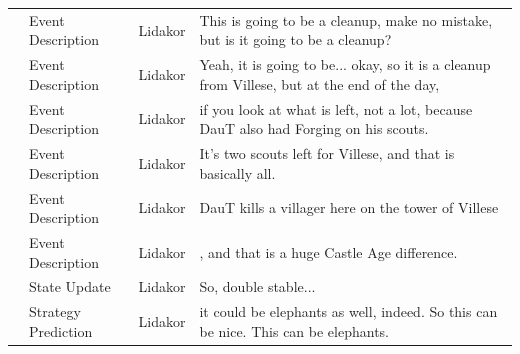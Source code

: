 {\begin{longtable}{@{}>{\theAppRow}r|L{2.3cm}L{1.0cm}U{11.55cm}@{}}
    & Event Description     & Lidakor & This is going to be a cleanup, make no mistake, but is it going to be a cleanup?                                                                                                                                                                                                                \\
    & Event Description     & Lidakor & Yeah, it is going to be... okay, so it is a cleanup from Villese, but at the end of the day,                                                                                                                                                                                                    \\
    & Event Description     & Lidakor & if you look at what is left, not a lot, because DauT also had Forging on his scouts.                                                                                                                                                                                                            \\
    & Event Description     & Lidakor & It's two scouts left for Villese, and that is basically all.                                                                                                                                                                                                                                    \\
    & Event Description     & Lidakor & DauT kills a villager here on the tower of Villese                                                                                                                                                                                                                                              \\
    & Event Description     & Lidakor & , and that is a huge Castle Age difference.                                                                                                                                                                                                                                                     \\
    & State Update          & Lidakor & So, double stable...                                                                                                                                                                                                                                                                            \\
    & Strategy Prediction   & Lidakor & it could be elephants as well, indeed. So this can be nice. This can be elephants.                                                                                                                                                                                                              \\

\end{longtable}}
